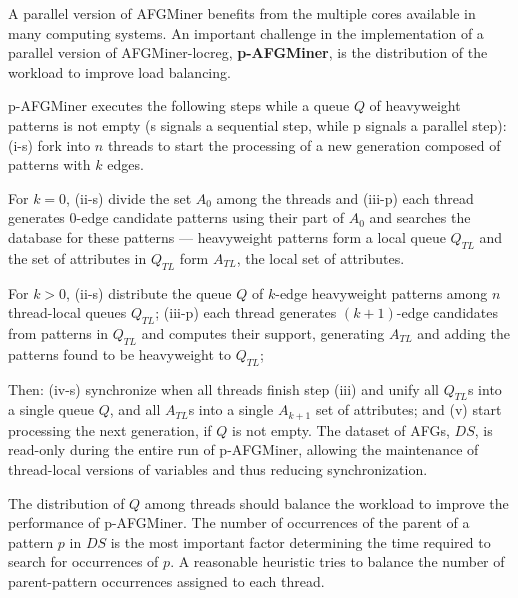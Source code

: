 A parallel version of AFGMiner benefits from the multiple cores available in many computing systems. An important challenge in the implementation of a parallel version of AFGMiner-locreg, {\bf p-AFGMiner}, is the distribution of the workload to improve load balancing.

p-AFGMiner executes the following steps while a queue $Q$ of heavyweight patterns is not empty (s signals a sequential step, while p signals a parallel step): (i-s) fork into $n$ threads to start the processing of a new generation composed of patterns with $k$ edges.

For $k = 0$, (ii-s) divide the set $A_0$ among the threads and (iii-p) each thread generates 0-edge candidate patterns using their part of $A_0$ and searches the database for these patterns --- heavyweight patterns form a local queue $Q_{TL}$ and the set of attributes in $Q_{TL}$ form $A_{TL}$, the local set of attributes.

For $k > 0$, (ii-s) distribute the queue $Q$ of $k$-edge heavyweight patterns among $n$ thread-local queues $Q_{TL}$; (iii-p) each thread generates $(k+1)$-edge candidates from patterns in $Q_{TL}$ and computes their support, generating $A_{TL}$ and adding the patterns found to be heavyweight to $Q_{TL}$; 

Then: (iv-s) synchronize when all threads finish step (iii) and unify all $Q_{TL}$s into a single queue $Q$, and all $A_{TL}$s into a single $A_{k+1}$ set of attributes; and (v) start processing the next generation, if $Q$ is not empty. The dataset of AFGs, $DS$, is read-only during the entire run of p-AFGMiner, allowing the maintenance of thread-local versions of variables and thus reducing synchronization.

The distribution of $Q$ among threads should balance the workload to improve the performance of p-AFGMiner. The number of occurrences of the parent of a pattern $p$ in $DS$ is the most important factor determining the time required to search for occurrences of $p$. A reasonable heuristic tries to balance the number of parent-pattern occurrences assigned to each thread. 


